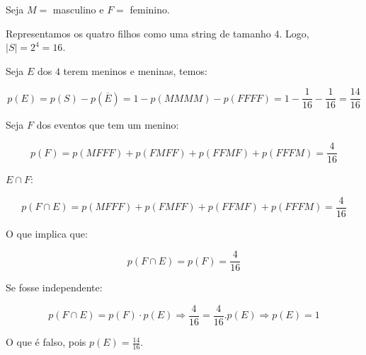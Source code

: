 \item

Seja $M = $ masculino e $F = $ feminino.

Representamos os quatro filhos como uma string de tamanho $4$. Logo, $|S|=2^4= 16$.

Seja $E$ dos $4$ terem meninos e meninas, temos:

\[p(E) = p(S) - p\left( {\overline E } \right) = 1 - p(MMMM) - p(FFFF) = 1 - \frac{1}{{16}} - \frac{1}{{16}} = \frac{{14}}{{16}}\]

Seja $F$ dos eventos que tem um menino:

\[p(F) = p(MFFF) + p(FMFF) + p(FFMF) + p(FFFM) = \frac{4}{{16}}\]

$E \cap F$:

\[p(F \cap E) = p(MFFF) + p(FMFF) + p(FFMF) + p(FFFM) = \frac{4}{{16}}\]

O que implica que:

\[p(F \cap E) = p(F) = \frac{4}{{16}}\]

Se fosse independente:

\[p(F \cap E) = p(F) \cdot p(E) \Rightarrow \frac{4}{{16}} = \frac{4}{{16}}.p(E) \Rightarrow p(E) = 1\]

O que é falso, pois $p(E)= \frac{14}{16}$.
